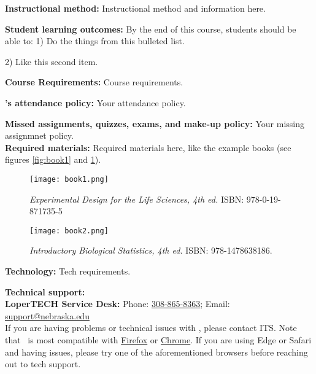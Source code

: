 \documentclass[11pt]{article}
\begin{document}
	\skippers
	\noindent\textbf{Instructional method:} Instructional method and information here.
	
	\skippers
	\noindent\textbf{Student learning outcomes:} 
	By the end of this course, students should be able to:
	\vskip0.025in
	1)	Do the things from this bulleted list.
	
	2)	Like this second item.
	
	\skippers
	\noindent\textbf{Course Requirements:} Course requirements.
	
	\skippers
	\noindent\textbf{\shortname's attendance policy:} Your attendance policy.
	
	\skippers
	\noindent\textbf{Missed assignments, quizzes, exams, and make-up policy:} Your missing assignmnet policy.\\
	 
	 \skippers
	\noindent\textbf{Required materials:} Required materials here, like the example books (see figures \ref{fig:book1} and \ref{fig:book2}). 
	
	\begin{figure}
		\begin{minipage}[c]{0.4\linewidth}
			\centering
			\texttt{[image: book1.png]}
			\caption{\textit{Experimental Design for the Life Sciences, 4th ed.} ISBN: 978-0-19-871735-5}
			\label{fig:book1}
		\end{minipage}
		\hfill
		\begin{minipage}[c]{0.4\linewidth}
			\centering
			\texttt{[image: book2.png]}
			\caption{\textit{Introductory Biological Statistics, 4th ed.} ISBN: 978-1478638186.}
			\label{fig:book2}
		\end{minipage}%
	\end{figure}
	
	\skippers
	\noindent\textbf{Technology:} Tech requirements.
	
	\skippers
	\noindent\textbf{Technical support:} \\
	\textbf{LoperTECH Service Desk:} Phone: \href{tel:13088658363}{308-865-8363}; Email: \href{mailto:support@nebraska.edu}{support@nebraska.edu}\\
	
	\noindent If you are having problems or technical issues with \canvas, please contact ITS. Note that \canvas\ is most compatible with \href{https://www.mozilla.org/en-US/firefox/new/}{Firefox} or \href{https://www.google.com/chrome/}{Chrome}. If you are using Edge or Safari and having issues, please try one of the aforementioned browsers before reaching out to tech support.
	
\end{document}
